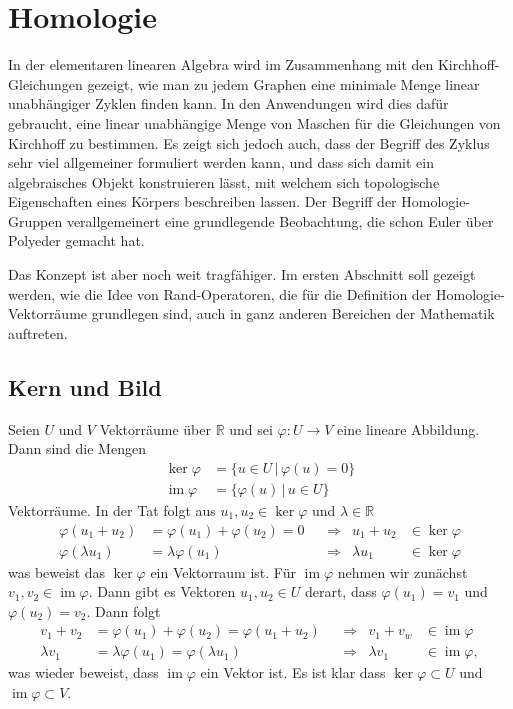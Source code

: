 %
%
%
\chapter{Homologie%
\label{chapter:homologie}}
In der elementaren linearen Algebra wird im Zusammenhang mit den
Kirchhoff-Gleichungen gezeigt, wie man zu jedem Graphen eine
minimale Menge linear unabhängiger Zyklen finden kann.
In den Anwendungen wird dies dafür gebraucht, eine linear unabhängige
Menge von Maschen für die Gleichungen von Kirchhoff zu bestimmen.
Es zeigt sich jedoch auch, dass der Begriff des Zyklus sehr viel
allgemeiner formuliert werden kann, und dass sich damit ein algebraisches
Objekt konstruieren lässt, mit welchem sich topologische Eigenschaften
eines Körpers beschreiben lassen.
Der Begriff der Homologie-Gruppen verallgemeinert eine grundlegende
Beobachtung, die schon Euler über Polyeder gemacht hat.

Das Konzept ist aber noch weit tragfähiger.
Im ersten Abschnitt soll gezeigt werden, wie die Idee von Rand-Operatoren,
die für die Definition der Homologie-Vektorräume grundlegen sind, 
auch in ganz anderen Bereichen der Mathematik auftreten.



\section{Kern und Bild}
Seien $U$ und $V$ Vektorräume über $\mathbb R$ und sei $\varphi\colon U\to V$
eine lineare Abbildung.
Dann sind die Mengen
\begin{align*}
\operatorname{ker}\varphi&=\{u\in U\,|\, \varphi(u) = 0\}
\\
\operatorname{im}\varphi&=\{\varphi(u)\,|\, u\in U\}
\end{align*}
Vektorräume.
In der Tat folgt aus $u_1,u_2\in\operatorname{ker}\varphi$
und $\lambda\in\mathbb R$
\begin{align*}
\varphi(u_1+u_2)&=\varphi(u_1)+\varphi(u_2) = 0
&
&\Rightarrow&
u_1+u_2&\in\operatorname{ker}\varphi
\\
\varphi(\lambda u_1)&=\lambda\varphi(u_1)
&
&\Rightarrow&
\lambda u_1&\in\operatorname{ker}\varphi
\end{align*}
was beweist das $\operatorname{ker}\varphi$ ein Vektorraum ist.
Für $\operatorname{im}\varphi$ nehmen wir zunächst
$v_1,v_2\in\operatorname{im}\varphi$.
Dann gibt es Vektoren $u_1,u_2\in U$ derart, dass
$\varphi(u_1)=v_1$ und $\varphi(u_2)=v_2$.
Dann folgt
\begin{align*}
v_1+v_2&=\varphi(u_1)+\varphi(u_2)=\varphi(u_1+u_2)
&
&\Rightarrow&
v_1+v_w&\in\operatorname{im}\varphi
\\
\lambda v_1&=\lambda\varphi(u_1)=\varphi(\lambda u_1)
&
&\Rightarrow&
\lambda v_1&\in\operatorname{im}\varphi,
\end{align*}
was wieder beweist, dass $\operatorname{im}\varphi$ ein Vektor ist.
Es ist klar dass $\operatorname{ker}\varphi\subset U$ und
$\operatorname{im}\varphi\subset V$.

